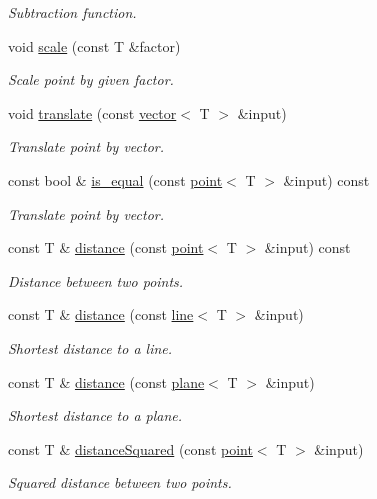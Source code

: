 \begin{DoxyCompactItemize}
\begin{DoxyCompactList}\small\item\em Subtraction function. \end{DoxyCompactList}\item 
void \hyperlink{classddd_1_1point_a5edb11d18e78ff66bc7aa2a5f26b8aa4}{scale} (const T \&factor)
\begin{DoxyCompactList}\small\item\em Scale point by given factor. \end{DoxyCompactList}\item 
void \hyperlink{classddd_1_1point_a36c06fef72376a058c663dd9632ddcd0}{translate} (const \hyperlink{classddd_1_1vector}{vector}$<$ T $>$ \&input)
\begin{DoxyCompactList}\small\item\em Translate point by vector. \end{DoxyCompactList}\item 
const bool \& \hyperlink{classddd_1_1point_ac18ef1f91134bce9bcfe8d8419ab0f2b}{is\+\_\+equal} (const \hyperlink{classddd_1_1point}{point}$<$ T $>$ \&input) const
\begin{DoxyCompactList}\small\item\em Translate point by vector. \end{DoxyCompactList}\item 
const T \& \hyperlink{classddd_1_1point_a36798ea778572d6145a709e7baf7893f}{distance} (const \hyperlink{classddd_1_1point}{point}$<$ T $>$ \&input) const
\begin{DoxyCompactList}\small\item\em Distance between two points. \end{DoxyCompactList}\item 
const T \& \hyperlink{classddd_1_1point_a8f6afdb0816e235ffd63a9d31a91e65f}{distance} (const \hyperlink{classddd_1_1line}{line}$<$ T $>$ \&input)
\begin{DoxyCompactList}\small\item\em Shortest distance to a line. \end{DoxyCompactList}\item 
const T \& \hyperlink{classddd_1_1point_a1080466b104b23a1b041f6049aaed15d}{distance} (const \hyperlink{classddd_1_1plane}{plane}$<$ T $>$ \&input)
\begin{DoxyCompactList}\small\item\em Shortest distance to a plane. \end{DoxyCompactList}\item 
const T \& \hyperlink{classddd_1_1point_a58ef7bc4870110dfd05c00609357756c}{distance\+Squared} (const \hyperlink{classddd_1_1point}{point}$<$ T $>$ \&input)
\begin{DoxyCompactList}\small\item\em Squared distance between two points. \end{DoxyCompactList}\end{DoxyCompactItemize}
